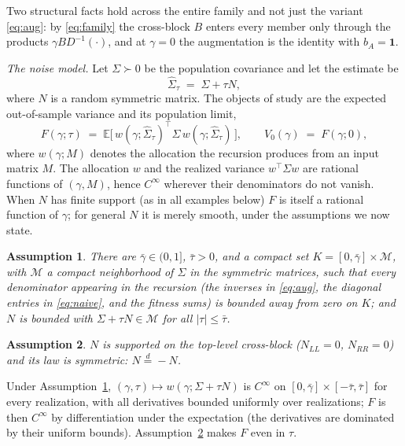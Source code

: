 \documentclass[11pt]{article}
\newtheorem{assumption}{Assumption}
\theoremstyle{remark}
\newcommand{\E}{\mathbb{E}}
\begin{document}
Two structural facts hold across the entire family and not just the variant
\eqref{eq:aug}: by \eqref{eq:family} the cross-block $B$ enters every member
only through the products $\gamma B D^{-1}(\cdot)$, and at $\gamma = 0$ the
augmentation is the identity with $b_A = \mathbf{1}$.

\emph{The noise model.} Let $\Sigma \succ 0$ be the population covariance
and let the estimate be
\begin{equation}
  \widehat\Sigma_\tau \;=\; \Sigma + \tau N,
  \label{eq:noise}
\end{equation}
where $N$ is a random symmetric matrix. The objects of study are the
expected out-of-sample variance and its population limit,
\begin{equation}
  F(\gamma; \tau) \;=\; \E\big[\, w(\gamma; \widehat\Sigma_\tau)^\top \Sigma\,
  w(\gamma; \widehat\Sigma_\tau) \,\big],
  \qquad
  V_0(\gamma) \;=\; F(\gamma; 0),
  \label{eq:F}
\end{equation}
where $w(\gamma; M)$ denotes the allocation the recursion produces from an
input matrix $M$. The allocation $w$ and the realized variance
$w^\top \Sigma w$ are rational functions of $(\gamma, M)$, hence $C^\infty$
wherever their denominators do not vanish. When $N$ has finite support (as
in all examples below) $F$ is itself a rational function of $\gamma$; for
general $N$ it is merely smooth, under the assumptions we now state.

\begin{assumption}
\label{ass:reg}
There are $\bar\gamma \in (0,1]$, $\bar\tau > 0$, and a compact set
$K = [0,\bar\gamma] \times \mathcal{M}$, with $\mathcal{M}$ a compact
neighborhood of $\Sigma$ in the symmetric matrices, such that every
denominator appearing in the recursion (the inverses in \eqref{eq:aug}, the
diagonal entries in \eqref{eq:naive}, and the fitness sums) is bounded away
from zero on $K$; and $N$ is bounded with
$\Sigma + \tau N \in \mathcal{M}$ for all $|\tau| \le \bar\tau$.
\end{assumption}

\begin{assumption}
\label{ass:noise}
$N$ is supported on the top-level cross-block ($N_{LL} = 0$, $N_{RR} = 0$)
and its law is symmetric: $N \overset{d}{=} -N$.
\end{assumption}

Under Assumption~\ref{ass:reg}, $(\gamma, \tau) \mapsto
w(\gamma; \Sigma + \tau N)$ is $C^\infty$ on $[0,\bar\gamma] \times
[-\bar\tau, \bar\tau]$ for every realization, with all derivatives bounded
uniformly over realizations; $F$ is then $C^\infty$ by differentiation under
the expectation (the derivatives are dominated by their uniform bounds).
Assumption~\ref{ass:noise} makes $F$ even in $\tau$.
\end{document}
